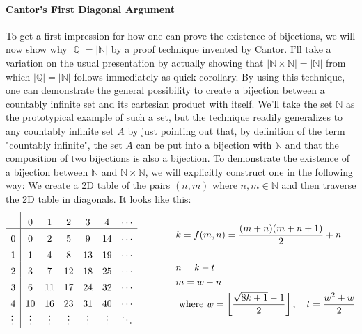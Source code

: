 \paragraph{Cantor's First Diagonal Argument} 
To get a first impression for how one can prove the existence of bijections, we will now show why $|\mathbb{Q}| = |\mathbb{N}|$ by a proof technique invented by Cantor. I'll take a variation on the usual presentation by actually showing that $|\mathbb{N} \times \mathbb{N}| = |\mathbb{N}|$ from which $|\mathbb{Q}| = |\mathbb{N}|$ follows immediately as quick corollary. By using this technique, one can demonstrate the general possibility to create a bijection between a countably infinite set and its cartesian product with itself. We'll take the set $\mathbb{N}$ as the prototypical example of such a set, but the technique readily generalizes to any countably infinite set $A$ by just pointing out that, by definition of the term "countably infinite", the set $A$ can be put into a bijection with $\mathbb{N}$ and that the composition of two bijections is also a bijection. To demonstrate the existence of a bijection between $\mathbb{N}$ and $\mathbb{N} \times \mathbb{N}$, we will explicitly construct one in the following way: We create a 2D table of the pairs $(n, m)$ where $n,m \in \mathbb{N}$ and then traverse the 2D table in diagonals. It looks like this:
\[
\setlength{\extrarowheight}{5pt}%
\begin{array}{l|*{6}{c}}
	       &  0     &  1     &  2     &  3      &  4     & \cdots \\
	\hline
	0      &  0     &  2     &  5     &  9      & 14     & \cdots \\
	1      &  1     &  4     &  8     & 13      & 19     & \cdots \\
	2      &  3     &  7     & 12     & 18      & 25     & \cdots \\
	3      &  6     & 11     & 17     & 24      & 32     & \cdots \\
	4      & 10     & 16     & 23     & 31      & 40     & \cdots \\
	\vdots & \vdots & \vdots & \vdots & \vdots  & \vdots & \ddots \\
\end{array} 
\qquad \qquad
\begin{aligned}
&k = f(m,n) = \frac{(m+n)(m+n+1)}{2} + n \\
\\
&n = k-t\\ 
&m = w-n\\
& \text{ where } w = \left\lfloor \frac{\sqrt{8k+1}-1}{2} \right\rfloor, 
  \quad          t = \frac{w^2+w}{2} 
\end{aligned}
\]

